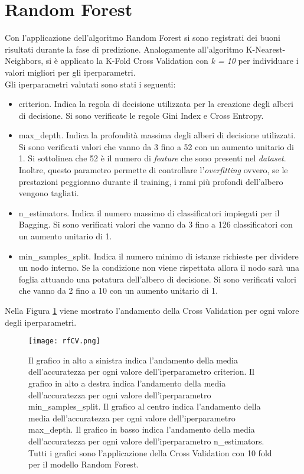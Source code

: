 \section{Random Forest}
Con l'applicazione dell'algoritmo Random Forest si sono registrati dei buoni risultati durante la fase di predizione. Analogamente all'algoritmo K-Nearest-Neighbors, si è applicato la K-Fold Cross Validation con \emph{k = 10} per individuare i valori migliori per gli iperparametri.\\
Gli iperparametri valutati sono stati i seguenti:
\begin{itemize}
	\item \textsf{criterion}. Indica la regola di decisione utilizzata per la creazione degli alberi di decisione. Si sono verificate le regole Gini Index e Cross Entropy.
	\item \textsf{max\_depth}. Indica la profondità massima degli alberi di decisione utilizzati. Si sono verificati valori che vanno da 3 fino a 52 con un aumento unitario di 1. Si sottolinea che 52 è il numero di \emph{feature} che sono presenti nel \emph{dataset}. Inoltre, questo parametro permette di controllare l'\emph{overfitting} ovvero, se le prestazioni peggiorano durante il training, i rami più profondi dell'albero vengono tagliati.
	\item \textsf{n\_estimators}. Indica il numero massimo di classificatori impiegati per il Bagging. Si sono verificati valori che vanno da 3 fino a 126 classificatori con un aumento unitario di 1.
	\item \textsf{min\_samples\_split}. Indica il numero minimo di istanze richieste per dividere un nodo interno. Se la condizione non viene rispettata allora il nodo sarà una foglia attuando una potatura dell'albero di decisione. Si sono verificati valori che vanno da 2 fino a 10 con un aumento unitario di 1.
\end{itemize}
Nella Figura \ref{fig:rfCV} viene mostrato l'andamento della Cross Validation per ogni valore degli iperparametri.
\begin{figure}[]
	\begin{center}
		\texttt{[image: rfCV.png]}
		\caption{Il grafico in alto a sinistra indica l'andamento della media dell'accuratezza per ogni valore dell'iperparametro \textsf{criterion}. Il grafico in alto a destra indica l'andamento della media dell'accuratezza per ogni valore dell'iperparametro \textsf{min\_samples\_split}. Il grafico al centro indica l'andamento della media dell'accuratezza per ogni valore dell'iperparametro \textsf{max\_depth}. Il grafico in basso indica l'andamento della media dell'accuratezza per ogni valore dell'iperparametro \textsf{n\_estimators}. Tutti i grafici sono l'applicazione della Cross Validation con 10 fold per il modello Random Forest. 
		} 
		\label{fig:rfCV}
	\end{center}
\end{figure}
